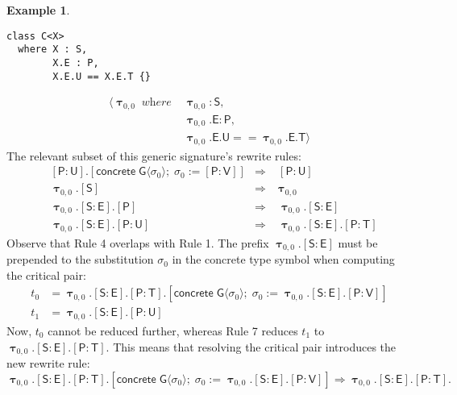 \documentclass[headsepline,bibliography=totoc]{scrreport}
\newcommand{\namesym}[1]{\mathsf{#1}}
\newcommand{\proto}[1]{\bm{\mathsf{#1}}}
\newcommand{\protosym}[1]{[\proto{#1}]}
\newcommand{\gensig}[2]{\langle #1\;\textit{where}\;#2\rangle}
\newcommand{\genericsym}[2]{\bm{\uptau}_{#1,#2}}
\newcommand{\assocsym}[2]{[\proto{#1}\colon\namesym{#2}]}
\newcommand{\concretesym}[1]{[\mathsf{concrete}\;#1]}
\theoremstyle{definition}
\newtheorem{example}{Example}[chapter]
\theoremstyle{definition}
\theoremstyle{definition}
\begin{document}
\begin{example}
\begin{listing}
\begin{Verbatim}
class C<X>
  where X : S,
        X.E : P,
        X.E.U == X.E.T {}
\end{Verbatim}
\end{listing}
\begin{align*}
\gensig{\genericsym{0}{0}}{&\genericsym{0}{0}\colon\proto{S},\\
&\genericsym{0}{0}.\namesym{E}\colon\proto{P},\\
&\genericsym{0}{0}.\namesym{E}.\namesym{U}==\genericsym{0}{0}.\namesym{E}.\namesym{T}}
\end{align*}
The relevant subset of this generic signature's rewrite rules:
\begin{align}
&\assocsym{P}{U}.\concretesym{\namesym{G}\langle\sigma_0\rangle;\;\sigma_0:=\assocsym{P}{V}}&\Rightarrow\;&\assocsym{P}{U}\tag{Rule 1}\\
&\genericsym{0}{0}.\protosym{S}&\Rightarrow\;&\genericsym{0}{0}\tag{Rule 2}\\
&\genericsym{0}{0}.\assocsym{S}{E}.\protosym{P}&\Rightarrow\;&\genericsym{0}{0}.\assocsym{S}{E}\tag{Rule 3}\\
&\genericsym{0}{0}.\assocsym{S}{E}.\assocsym{P}{U}&\Rightarrow\;&\genericsym{0}{0}.\assocsym{S}{E}.\assocsym{P}{T}\tag{Rule 4}
\end{align}
Observe that Rule 4 overlaps with Rule 1. The prefix $\genericsym{0}{0}.\assocsym{S}{E}$ must be prepended to the substitution $\sigma_0$ in the concrete type symbol when computing the critical pair:
\begin{align*}
t_0&=\genericsym{0}{0}.\assocsym{S}{E}.\assocsym{P}{T}.\concretesym{\namesym{G}\langle\sigma_0\rangle;\;\sigma_0:=\genericsym{0}{0}.\assocsym{S}{E}.\assocsym{P}{V}}\\
t_1&=\genericsym{0}{0}.\assocsym{S}{E}.\assocsym{P}{U}
\end{align*}
Now, $t_0$ cannot be reduced further, whereas Rule 7 reduces $t_1$ to
$\genericsym{0}{0}.\assocsym{S}{E}.\assocsym{P}{T}$.
This means that resolving the critical pair introduces the new rewrite rule:
\[\genericsym{0}{0}.\assocsym{S}{E}.\assocsym{P}{T}.\concretesym{\namesym{G}\langle\sigma_0\rangle;\;\sigma_0:=\genericsym{0}{0}.\assocsym{S}{E}.\assocsym{P}{V}}\Rightarrow\genericsym{0}{0}.\assocsym{S}{E}.\assocsym{P}{T}.
\]
\end{example}
\end{document}
